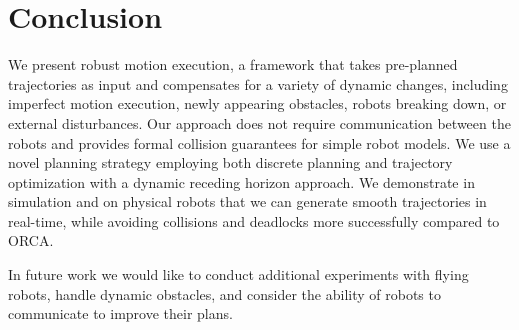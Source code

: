 \documentclass{svproc}
\newcommand{\todo}[1]{\textbf{\textcolor{red}{TODO: #1}}}
\begin{document}



\section{Conclusion}

We present robust motion execution, a framework that takes pre-planned trajectories as input and compensates for a variety of dynamic changes, including imperfect motion execution, newly appearing obstacles, robots breaking down, or external disturbances.
Our approach does not require communication between the robots and provides formal collision guarantees for simple robot models.
We use a novel planning strategy employing both discrete planning and trajectory optimization with a dynamic receding horizon approach.
We demonstrate in simulation and on physical robots that we can generate smooth trajectories in real-time, while avoiding collisions and deadlocks more successfully compared to ORCA.

In future work we would like to conduct additional experiments with flying robots, handle dynamic obstacles, and consider the ability of robots to communicate to improve their plans.


%
%





 
\end{document}
